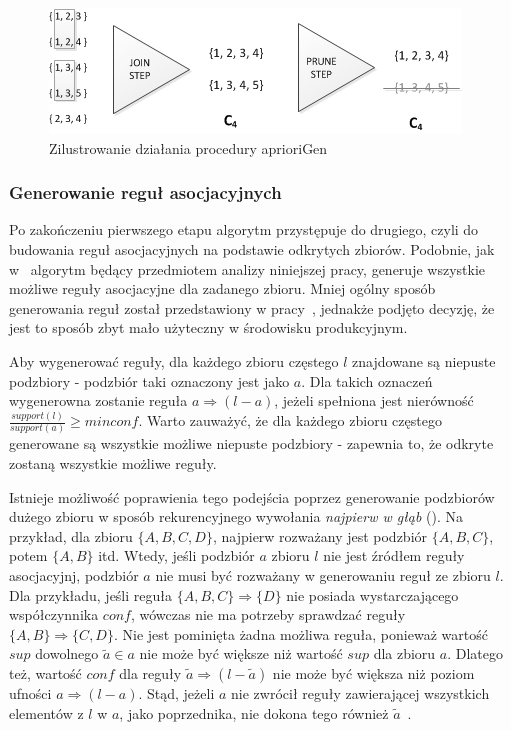 \begin{figure}[h]
\centering\includegraphics{figures/02/candidates_generation.png}
\caption{Zilustrowanie działania procedury aprioriGen}\label{rys:example_candidates}
\end{figure}

\subsubsection{Generowanie reguł asocjacyjnych}
Po zakończeniu pierwszego etapu algorytm przystępuje do drugiego, czyli do budowania reguł asocjacyjnych na podstawie odkrytych zbiorów. Podobnie, jak w~\cite{Apriori:Main} algorytm będący przedmiotem analizy niniejszej pracy, generuje wszystkie możliwe reguły asocjacyjne dla zadanego zbioru. Mniej ogólny sposób generowania reguł został przedstawiony w pracy~\cite{Problem:Statement}, jednakże podjęto decyzję, że jest to sposób zbyt mało użyteczny w środowisku produkcyjnym.

Aby wygenerować reguły, dla każdego zbioru częstego $l$ znajdowane są niepuste podzbiory - podzbiór taki oznaczony jest jako $a$. Dla takich oznaczeń wygenerowna zostanie reguła $a \Rightarrow (l-a)$, jeżeli spełniona jest nierówność $\frac{support(l)}{support(a)} \geq minconf$. Warto zauważyć, że dla każdego zbioru częstego generowane są wszystkie możliwe niepuste podzbiory - zapewnia to, że odkryte zostaną wszystkie możliwe reguły.

Istnieje możliwość poprawienia tego podejścia poprzez generowanie podzbiorów dużego zbioru w sposób rekurencyjnego wywołania \emph{najpierw w głąb} (). Na przykład, dla zbioru $\lbrace A, B, C, D \rbrace$, najpierw rozważany jest podzbiór $\lbrace A, B, C \rbrace$, potem $\lbrace A, B \rbrace$ itd. Wtedy, jeśli podzbiór $a$ zbioru $l$ nie jest źródłem reguły asocjacyjnj, podzbiór $a$ nie musi być rozważany w generowaniu reguł ze zbioru $l$. Dla przykładu, jeśli reguła $\lbrace A, B, C \rbrace \Rightarrow \lbrace D \rbrace$ nie posiada wystarczającego współczynnika $conf$, wówczas nie ma potrzeby sprawdzać reguły $\lbrace A, B \rbrace \Rightarrow \lbrace C, D \rbrace$. Nie jest pominięta żadna możliwa reguła, ponieważ wartość $sup$ dowolnego $\tilde{a} \in a$ nie może być większe niż wartość $sup$ dla zbioru $a$. Dlatego też, wartość $conf$ dla reguły $\tilde{a} \Rightarrow (l - \tilde{a})$ nie może być większa niż poziom ufności $a \Rightarrow (l-a)$. Stąd, jeżeli $a$ nie zwrócił reguły zawierającej wszystkich elementów z $l$ w $a$, jako poprzednika, nie dokona tego również $\tilde{a}$~\cite{Main:Apriori}.

